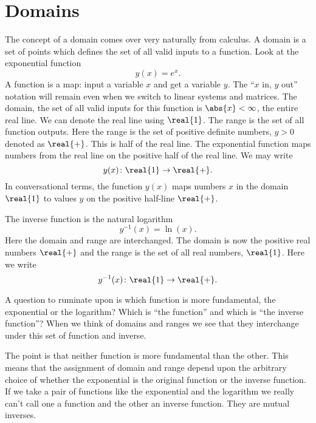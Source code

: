 \section{Domains}
The concept of a domain comes over very naturally from calculus. A domain is a set of points which defines the set of all valid inputs to a function. Look at the exponential function
\begin{equation}
  y(x) = e^{x}.
\end{equation}
A function is a map: input a variable $x$ and get a variable $y$. The ``$x$ in, $y$ out'' notation will remain even when we switch to linear systems and matrices.
The domain, the set of all valid inputs for this function is $\abs{x}<\infty$, the entire real line. We can denote the real line using $\real{1}$. The range is the set of all function outputs. Here the range is the set of positive definite numbers, $y>0$ denoted as $\real{+}$. This is half of the real line. The exponential function maps numbers from the real line on the positive half of the real line. We may write
\begin{equation}
  y(x)\colon\real{1}\to\real{+}.
\end{equation}
In conversational terms, the function $y(x)$ maps numbers $x$ in the domain $\real{1}$ to values $y$ on the positive half-line $\real{+}$.


The inverse function is the natural logarithm
\begin{equation}
  y^{-1}(x) = \ln (x).
\end{equation}
Here the domain and range are interchanged. The domain is now the positive real numbers $\real{+}$ and the range is the set of all real numbers, $\real{1}$. Here we write
\begin{equation}
  y^{-1}(x)\colon\real{1}\to\real{+}.
\end{equation}

A question to ruminate upon is which function is more fundamental, the exponential or the logarithm? Which is ``the function'' and which is ``the inverse function''? When we think of domains and ranges we see that they interchange under this set of function and inverse. 

The point is that neither function is more fundamental than the other. This means that the assignment of domain and range depend upon the arbitrary choice of whether the exponential is the original function or the inverse function. If we take a pair of functions like the exponential and the logarithm we really can't call one a function and the other an inverse function. They are mutual inverses.

